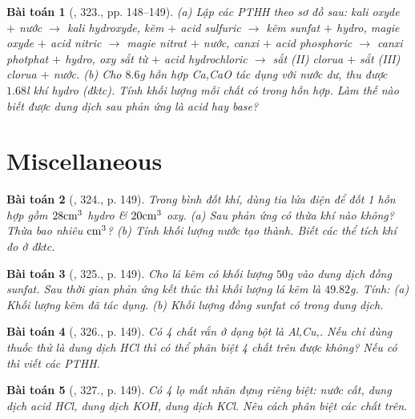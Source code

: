 \documentclass{article}
\newtheorem{baitoan}{Bài toán}
\begin{document}
\begin{baitoan}[\cite{An_400_BT_Hoa_Hoc_8_2020}, 323., pp. 148--149]
	(a) Lập các PTHH theo sơ đồ sau: kali oxyde $+$ nước $\to$ kali hydroxyde, kẽm $+$ acid sulfuric $\to$ kẽm sunfat $+$ hydro, magie oxyde $+$ acid nitric $\to$ magie nitrat $+$ nước, canxi $+$ acid phosphoric $\to$ canxi photphat $+$ hydro, oxy sắt từ \emph{} $+$ acid hydrochloric $\to$ sắt (II) clorua $+$ sắt (III) clorua $+$ nước. (b) Cho $8.6$\emph{g} hỗn hợp \emph{Ca,CaO} tác dụng với nước dư, thu được $1.68$\emph{l} khí hydro (đktc). Tính khối lượng mỗi chất có trong hỗn hợp. Làm thế nào biết được dung dịch sau phản ứng là acid hay base?
\end{baitoan}


\section{Miscellaneous}

\begin{baitoan}[\cite{An_400_BT_Hoa_Hoc_8_2020}, 324., p. 149]
	Trong bình đốt khí, dùng tia lửa điện để đốt 1 hỗn hợp gồm $\rm28cm^3$ hydro \& $\rm20cm^3$ oxy. (a) Sau phản ứng có thừa khí nào không? Thừa bao nhiêu $\rm cm^3$? (b) Tính khối lượng nước tạo thành. Biết các thể tích khí đo ở đktc.
\end{baitoan}

\begin{baitoan}[\cite{An_400_BT_Hoa_Hoc_8_2020}, 325., p. 149]
	Cho lá kẽm có khối lượng $50$\emph{g} vào dung dịch đồng sunfat. Sau thời gian phản ứng kết thúc thì khối lượng lá kẽm là $49.82$\emph{g}. Tính: (a) Khối lượng kẽm đã tác dụng. (b) Khối lượng đồng sunfat có trong dung dịch.
\end{baitoan}

\begin{baitoan}[\cite{An_400_BT_Hoa_Hoc_8_2020}, 326., p. 149]
	Có 4 chất rắn ở dạng bột là \emph{Al,Cu,}. Nếu chỉ dùng thuốc thử là dung dịch \emph{HCl} thì có thể phân biệt 4 chất trên được không? Nếu có thì viết các PTHH.
\end{baitoan}

\begin{baitoan}[\cite{An_400_BT_Hoa_Hoc_8_2020}, 327., p. 149]
	Có 4 lọ mất nhãn đựng riêng biệt: nước cất, dung dịch acid \emph{HCl}, dung dịch \emph{KOH}, dung dịch \emph{KCl}. Nêu cách phân biệt các chất trên.
\end{baitoan}
\end{document}
